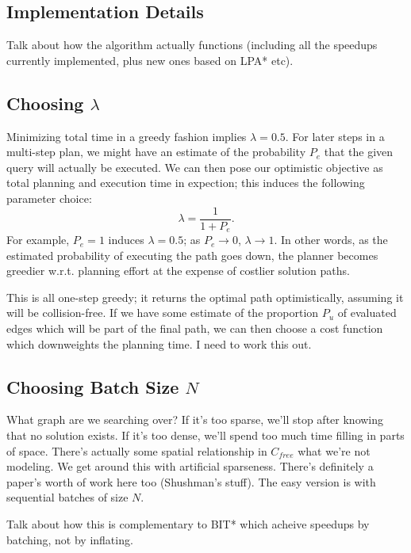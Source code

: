 \documentclass{report}
\begin{document}
\subsection{Implementation Details}

Talk about how the algorithm actually functions
(including all the speedups currently implemented,
plus new ones based on LPA* etc).

\subsection{Choosing $\lambda$}

Minimizing total time in a greedy fashion implies $\lambda = 0.5$.
For later steps in a multi-step plan,
we might have an estimate of the probability $P_e$ that the given query will
actually be executed.
We can then pose our optimistic objective as total planning and execution
time in expection;
this induces the following parameter choice:
\begin{equation}
   \lambda = \frac{1}{1 + P_e} .
\end{equation}
For example, $P_e=1$ induces $\lambda = 0.5$;
as $P_e \rightarrow 0$, $\lambda \rightarrow 1$.
In other words,
as the estimated probability of executing the path goes down,
the planner becomes greedier w.r.t. planning effort at the expense of
costlier solution paths.

This is all one-step greedy;
it returns the optimal path optimistically,
assuming it will be collision-free.
If we have some estimate of the proportion $P_u$ of evaluated edges
which will be part of the final path,
we can then choose a cost function which downweights the planning time.
I need to work this out. 

\subsection{Choosing Batch Size $N$}

What graph are we searching over?
If it's too sparse, we'll stop after knowing that no solution exists.
If it's too dense, we'll spend too much time filling in parts of
space.
There's actually some spatial relationship in $C_{free}$ what we're not
modeling.
We get around this with artificial sparseness.
There's definitely a paper's worth of work here too (Shushman's stuff).
The easy version is with sequential batches of size $N$.

Talk about how this is complementary to BIT* which acheive speedups
by batching, not by inflating.
\end{document}

